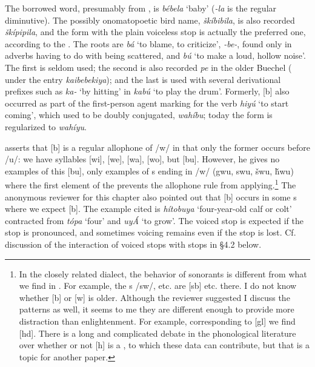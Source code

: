 \documentclass[output=paper]{LSP/langsci}
\begin{document}
The borrowed word, presumably from , is \textit{bébela} `baby' (\textit{-la} is the regular  diminutive). The possibly onomatopoetic bird name, \textit{\v{s}kíbibila}, is also recorded \textit{\v{s}kípipila}, and the form with the plain voiceless stop is actually the preferred one, according to the . The roots are \textit{bá} `to blame, to criticize', \textit{-be-}, found only in adverbs having to do with being scattered, and \textit{bú} `to make a loud, hollow noise'. The first is seldom used; the second is also recorded \textit{pe} in the older Buechel  (\citealt[278]{Buechel1970} under the entry \textit{kaibebekiya}); and the last is used with several derivational prefixes such as \textit{ka-} `by hitting' in \textit{kabú} `to play the drum'. Formerly, [b] also occurred as part of the first-person agent marking for the verb \textit{hiyú} `to start coming', which used to be doubly conjugated, \textit{wahíbu}; today the form is regularized to \textit{wahíyu}.

\citet[8]{Rankin2001} asserts that [b] is a regular allophone of /w/ in that only the former occurs before /u/: we have syllables [wi], [we], [wa], [wo], but [bu]. However, he gives no examples of this [bu], only examples of s ending in /w/ (gwu, swu, \v{s}wu, \v{h}wu) where the first element of the  prevents the allophone rule from applying.\footnote{In the closely related  dialect, the behavior of sonorants is different from what we find in . For example, the s /sw/, etc. are [sb] etc. there. I do not know whether [b] or [w] is older. Although the reviewer suggested I discuss the  patterns as well, it seems to me they are different enough to provide more distraction than enlightenment. For example, corresponding to  [gl] we find  [hd]. There is a long and complicated debate in the phonological literature over whether or not [h] is a , to which these  data can contribute, but that is a topic for another paper.} The anonymous reviewer for this chapter also pointed out that [b] occurs in some s where we expect [b]. The example cited is \textit{hítobuya} `four-year-old calf or colt' contracted from \textit{t\'opa} `four' and \textit{uyÁ} `to grow'. The voiced stop is expected if the  stop is pronounced, and sometimes voicing remains even if the  stop is lost. Cf. discussion of the interaction of voiced stops with  stops in \S 4.2 below.
\end{document}
